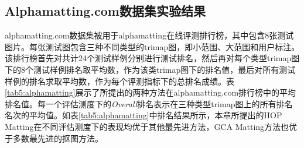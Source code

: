 \subsection{Alphamatting.com数据集实验结果}
alphamatting.com数据集被用于alphamatting在线评测排行榜，其中包含8张测试图片。每张测试图包含三种不同类型的trimap图，即小范围、大范围和用户标注。该排行榜首先对共计24个测试样例分别进行测试排名，然后再对每个类型trimap图下的8个测试样例排名取平均数，作为该类trimap图下的排名值，最后对所有测试样例的排名求取平均数，作为每个评测指标下的总排名成绩。表\ref{tab5:alphamatting}展示了所提出的两种方法在alphamatting.com排行榜中的平均排名值。每一个评估测度下的\textit{Overall}排名表示在三种类型trimap图上的所有排名名次的平均值。如表\ref{tab5:alphamatting}中排名结果所示，本章所提出的HOP Matting在不同评估测度下的表现均优于其他最先进方法，GCA Matting方法也优于多数最先进的抠图方法。

